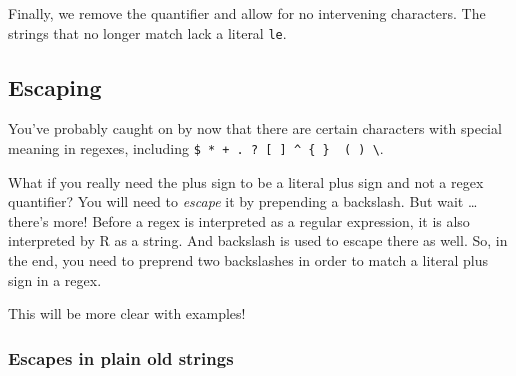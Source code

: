 \documentclass[
]{book}
\newenvironment{Shaded}{\begin{snugshade}}{\end{snugshade}}
\newcommand{\CommentTok}[1]{\textcolor[rgb]{0.56,0.35,0.01}{\textit{#1}}}
\newcommand{\DataTypeTok}[1]{\textcolor[rgb]{0.13,0.29,0.53}{#1}}
\newcommand{\KeywordTok}[1]{\textcolor[rgb]{0.13,0.29,0.53}{\textbf{#1}}}
\newcommand{\NormalTok}[1]{#1}
\newcommand{\StringTok}[1]{\textcolor[rgb]{0.31,0.60,0.02}{#1}}
\begin{document}
Finally, we remove the quantifier and allow for no intervening characters. The strings that no longer match lack a literal \texttt{le}.

\begin{Shaded}
\end{Shaded}

\hypertarget{escaping}{%
\subsection{Escaping}\label{escaping}}

You've probably caught on by now that there are certain characters with special meaning in regexes, including \texttt{\$\ *\ +\ .\ ?\ {[}\ {]}\ \^{}\ \{\ \}\ \textbar{}\ (\ )\ \textbackslash{}}.

What if you really need the plus sign to be a literal plus sign and not a regex quantifier? You will need to \emph{escape} it by prepending a backslash. But wait \ldots{} there's more! Before a regex is interpreted as a regular expression, it is also interpreted by R as a string. And backslash is used to escape there as well. So, in the end, you need to preprend two backslashes in order to match a literal plus sign in a regex.

This will be more clear with examples!

\hypertarget{escapes-in-plain-old-strings}{%
\subsubsection{Escapes in plain old strings}\label{escapes-in-plain-old-strings}}
\end{document}
